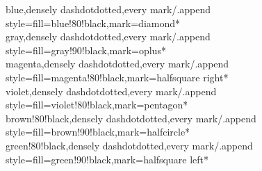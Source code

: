 \documentclass[a4paper]{article}
\begin{document}
{	blue,densely dashdotdotted,every mark/.append style={fill=blue!80!black},mark=diamond*\\
	gray,densely dashdotdotted,every mark/.append style={fill=gray!90!black},mark=oplus*\\
	magenta,densely dashdotdotted,every mark/.append style={fill=magenta!80!black},mark=halfsquare right*\\
	violet,densely dashdotdotted,every mark/.append style={fill=violet!80!black},mark=pentagon*\\
	brown!80!black,densely dashdotdotted,every mark/.append style={fill=brown!90!black},mark=halfcircle*\\
	green!80!black,densely dashdotdotted,every mark/.append style={fill=green!90!black},mark=halfsquare left*\\
}

\section{}
\end{document}
